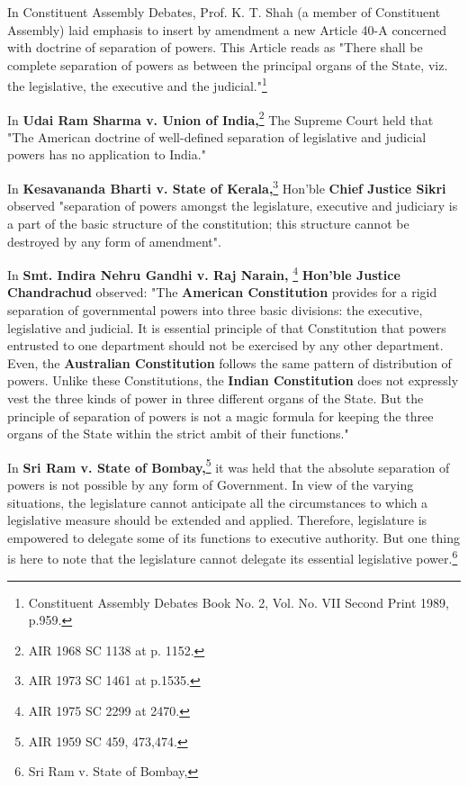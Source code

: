 \begin{multicols}{2}
\noi
In Constituent Assembly Debates, Prof. K. T. Shah (a member of Constituent Assembly) laid
emphasis to insert by amendment a new Article 40-A concerned with doctrine of separation of
powers. This Article reads as "There shall be complete separation of powers as between the
principal organs of the State, viz. the legislative, the executive and the judicial."\footnote{Constituent Assembly Debates Book No. 2, Vol. No. VII Second Print 1989, p.959.}

\noi
In \textbf{Udai Ram Sharma v. Union of India,}\footnote{AIR 1968 SC 1138 at p. 1152.} The Supreme Court held that "The American doctrine of well-defined separation of legislative and judicial powers has no application to India."

\noi
In \textbf{Kesavananda Bharti v. State of Kerala,}\footnote{AIR 1973 SC 1461 at p.1535.} Hon'ble \textbf{Chief Justice Sikri} observed "separation of powers amongst the legislature, executive and judiciary is a part of the basic structure of the constitution; this structure cannot be destroyed by any form of amendment".

\noi
In \textbf{Smt. Indira Nehru Gandhi v. Raj Narain,} \footnote{AIR 1975 SC 2299 at 2470.} \textbf{Hon'ble Justice Chandrachud} observed: "The \textbf{American Constitution} provides for a rigid separation of governmental powers into three basic divisions: the executive, legislative and judicial. It is essential principle of that Constitution that powers entrusted to one department should not be exercised by any other department. Even, the \textbf{Australian Constitution} follows the same pattern of distribution of powers. Unlike these Constitutions, the \textbf{Indian Constitution} does not expressly vest the three kinds of power in three different organs of the State. But the principle of separation of powers is not a magic formula for keeping the three organs of the State within the strict ambit of their functions."

\noi
In \textbf{Sri Ram v. State of Bombay,}\footnote{AIR 1959 SC 459, 473,474.} it was held that the absolute separation of powers is not possible by any form of Government. In view of the varying situations, the legislature cannot anticipate all the circumstances to which a legislative measure should be extended and applied.
Therefore, legislature is empowered to delegate some of its functions to executive authority. But
one thing is here to note that the legislature cannot delegate its essential legislative power.\footnote{Sri Ram v. State of Bombay,}


\end{multicols}
